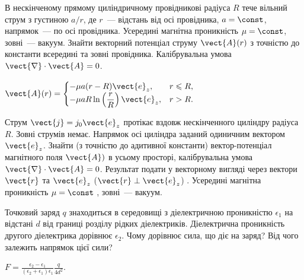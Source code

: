 \begin{problem}
В нескінченому прямому циліндричному провідникові радіуса $R$ тече вільний струм з густиною $a/r$, де
$r$~--- відстань від осі провідника, $a = \const$, напрямок~--- по осі провідника. Усередині магнітна
проникність $\mu = \const$, зовні~--- вакуум. Знайти векторний потенціал струму $\vect{A}(r)$  з
точністю до константи всередині та зовні провідника. Калібрувальна умова $\vect{\nabla}\cdot\vect{A} =
0$.
\begin{solution}
	$
\vect{A}(r) =
\begin{cases}
-\mu a (r - R) \vect{e}_z, & r \leqslant R, \\
-\mu a R \ln \left( \dfrac{r}{R} \right) \vect{e}_z, & r > R.
\end{cases}
	$
\end{solution}
\end{problem}

\begin{problem}
Струм  $\vect{j} = j_0 \vect{e}_z$ протікає вздовж нескінченного циліндру радіуса $R$. Зовні струмів
немає. Напрямок осі циліндра заданий одиничним вектором  $\vect{e}_z$. Знайти (з точністю до адитивної
константи) вектор-потенціал магнітного поля $\vect{A})$  в усьому просторі, калібрувальна умова
$\vect{\nabla}\cdot\vect{A} = 0$. Результат подати у векторному вигляді через вектори $\vect{r}$ та
$\vect{e}_z$ ($\vect{r} \perp \vect{e}_z$) . Усередині магнітна проникність $\mu = \const$  ,
зовні~--- вакуум.
\end{problem}

\begin{problem}
Точковий заряд $q$ знаходиться в середовищі з діелектричною проникністю $\epsilon_1$ на відстані $d$ від границі розділу рідких діелектриків. Діелектрична проникність другого діелектрика дорівнює $\epsilon_2$. Чому дорівнює сила, що діє на заряд? Від чого залежить напрямок цієї сили?
\begin{solution}
	$F = \frac{\epsilon_2 - \epsilon_1}{(\epsilon_2 + \epsilon_1)\epsilon_1} \frac{q}{4d^2}$.
\end{solution}
\end{problem}

